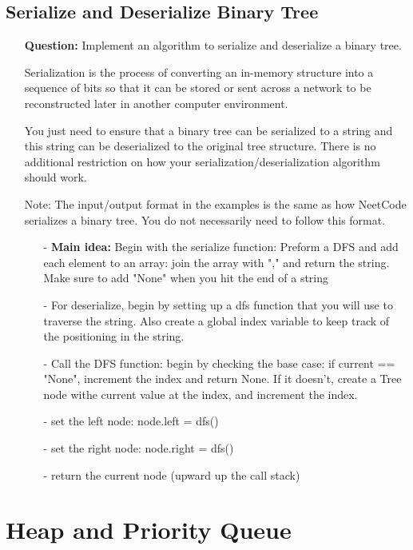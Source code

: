 \documentclass[12pt]{article}
\begin{document}
\subsection{Serialize and Deserialize Binary Tree}
\begin{enumerate}
  \item[] \textbf{Question:} Implement an algorithm to serialize and deserialize a binary tree.

Serialization is the process of converting an in-memory structure into a sequence of bits so that it can be stored or sent across a network to be reconstructed later in another computer environment.

You just need to ensure that a binary tree can be serialized to a string and this string can be deserialized to the original tree structure. There is no additional restriction on how your serialization/deserialization algorithm should work.

Note: The input/output format in the examples is the same as how NeetCode serializes a binary tree. You do not necessarily need to follow this format.

    \begin{enumerate}
      \item[-] \textbf{Main idea:} Begin with the serialize function: Preform a DFS and add each element to an array: join the array with "," and return the string. Make sure to add "None" when you hit the end of a string
      \item[-] For deserialize, begin by setting up a dfs function that you will use to traverse the string. Also create a global index variable to keep track of the positioning in the string. 
      \item[-] Call the DFS function: begin by checking the base case: if current == "None", increment the index and return None. If it doesn't, create a Tree node withe current value at the index, and increment the index.
      \item[-] set the left node: node.left = dfs()
      \item[-] set the right node: node.right = dfs()
      \item[-] return the current node (upward up the call stack)
    \end{enumerate}
\end{enumerate}


\section{Heap and Priority Queue}
\end{document}
